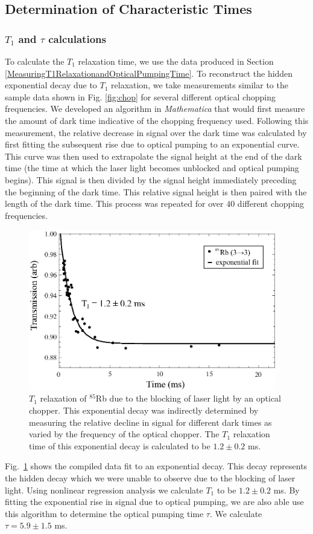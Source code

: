 \subsection{Determination of Characteristic Times}\label{DeterminationofTimes}

\subsubsection{$T_{1}$ and $\tau$ calculations}
To calculate the $T_1$ relaxation time, we use the data produced in Section \ref{MeasuringT1RelaxationandOpticalPumpingTime}.  To reconstruct the hidden exponential decay due to $T_1$ relaxation, we take measurements similar to the sample data shown in Fig. \ref{fig:chop} for several different optical chopping frequencies.  We developed an algorithm in \emph{Mathematica} that would first measure the amount of dark time indicative of the chopping frequency used.  Following this measurement, the relative decrease in signal over the dark time was calculated by first fitting the subsequent rise due to optical pumping to an exponential curve.  This curve was then used to extrapolate the signal height at the end of the dark time (the time at which the laser light becomes unblocked and optical pumping begins).  This signal is then divided by the signal height immediately preceding the beginning of the dark time.  This relative signal height is then paired with the length of the dark time.  This process was repeated for over $40$ different chopping frequencies.  
\begin{figure}[htbp]
\begin{center}
\includegraphics[height=70mm]{./figures/T1.eps}
\caption{\small{$T_1$ relaxation of $^{85}$Rb due to the blocking of laser light by an optical chopper.  This exponential decay was indirectly determined by measuring the relative decline in signal for different dark times as varied by the frequency of the optical chopper.  The $T_1$ relaxation time of this exponential decay is calculated to be $1.2\pm 0.2$ ms.}}
\label{fig:T1}
\end{center}
\end{figure}
Fig.~\ref{fig:T1} shows the compiled data fit to an exponential decay.  This decay represents the hidden decay which we were unable to observe due to the blocking of laser light.  Using nonlinear regression analysis we calculate $T_1$ to be $1.2 \pm 0.2$ ms.  By fitting the exponential rise in signal due to optical pumping, we are also able use this algorithm to determine the optical pumping time $\tau$. We calculate $\tau=5.9 \pm 1.5$ ms.  

